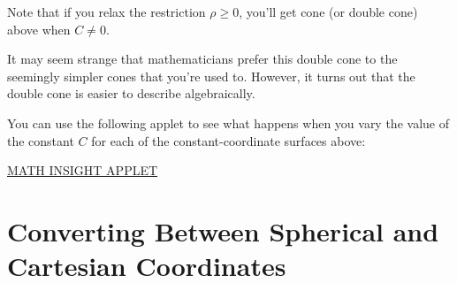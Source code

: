\documentclass{ximera}
\begin{document}
\begin{image}
\end{image}

Note that if you relax the restriction $\rho\geq 0$, you'll get cone (or double cone) above when $C\neq 0$.

It may seem strange that mathematicians prefer this double cone to the seemingly simpler cones that you're used to. However, it turns out that the double cone is easier to describe algebraically.

You can use the following applet to see what happens when you vary the value of the constant $C$ for each of the constant-coordinate surfaces above:

\href{https://mathinsight.org/spherical_coordinates}{MATH INSIGHT APPLET}

\section{Converting Between Spherical and Cartesian Coordinates}
\end{document}
